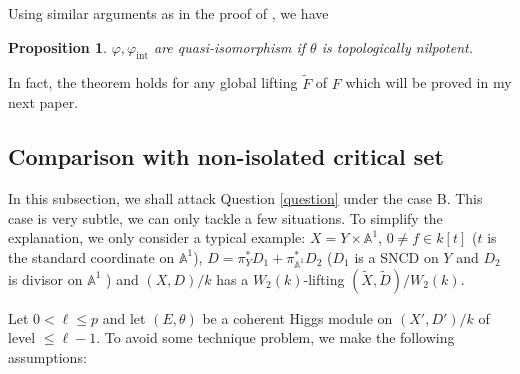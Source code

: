 \documentclass[12pt, a4paper]{article}
\newtheorem{proposition}{Proposition}[section]
\newtheorem{theorem}{Theorem}[section]
\begin{document}
Using similar arguments as in the proof of \cite[Proposition 3.8]{SZ2}, we have
\begin{proposition}\label{formal Cartier iso}
$\varphi,\varphi_\mathrm{int}$ are quasi-isomorphism if $\theta$ is topologically nilpotent.
 \end{proposition}
In fact, the theorem holds for any global lifting $\tilde F$ of $F$ which will be proved in my next paper.
\subsection{Comparison with non-isolated critical set}
In this subsection, we shall attack Question \ref{question} under the case B. This case is very subtle, we can only tackle a few situations. To simplify the explanation, we only consider a typical example: $X=Y\times\mathbb A^1$, $0\neq f\in k[t]$ ($t$ is the standard coordinate on $\mathbb A^1$), $D=\pi_Y^*D_1+\pi^*_{\mathbb A^1}D_2$ ($D_1$ is a SNCD on $Y$ and $D_2$ is divisor on $\mathbb A^1$ ) and $(X,D)/k$ has a $W_2(k)$-lifting $(\tilde X,\tilde D)/W_2(k)$.

\iffalse
Let $0<\ell\leq p$ and let $(E,\theta)$ be a coherent Higgs module on $(X',D')/k$ of level $\leq\ell-1$. To avoid some technique problem, we make the following assumptions:
\end{document}
